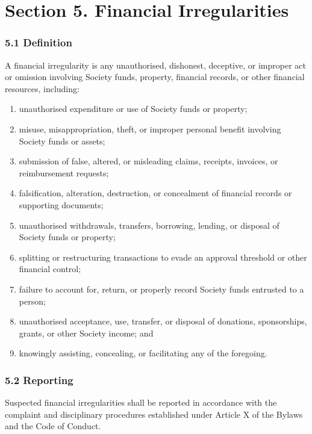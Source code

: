 \documentclass[a4paper]{article}
\begin{document}
\section*{Section 5. Financial Irregularities}

\subsubsection*{5.1 Definition}
A financial irregularity is any unauthorised, dishonest, deceptive, or
improper act or omission involving Society funds, property, financial
records, or other financial resources, including:
\begin{enumerate}
    \item unauthorised expenditure or use of Society funds or property;
    \item misuse, misappropriation, theft, or improper personal benefit
    involving Society funds or assets;
    \item submission of false, altered, or misleading claims, receipts,
    invoices, or reimbursement requests;
    \item falsification, alteration, destruction, or concealment of
    financial records or supporting documents;
    \item unauthorised withdrawals, transfers, borrowing, lending, or
    disposal of Society funds or property;
    \item splitting or restructuring transactions to evade an approval
    threshold or other financial control;
    \item failure to account for, return, or properly record Society
    funds entrusted to a person;
    \item unauthorised acceptance, use, transfer, or disposal of
    donations, sponsorships, grants, or other Society income; and
    \item knowingly assisting, concealing, or facilitating any of the
    foregoing.
\end{enumerate}

\subsubsection*{5.2 Reporting}
Suspected financial irregularities shall be reported in accordance with
the complaint and disciplinary procedures established under Article X
of the Bylaws and the Code of Conduct.
\end{document}
